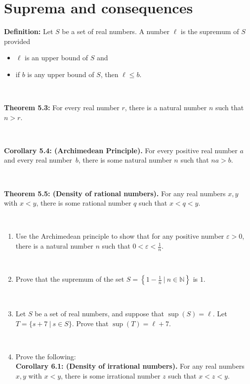 \documentclass[12pt]{amsart}
\newcommand{\N}{\mathbb{N}}
\newcommand{\e}{\varepsilon}
\newcommand{\ds}{\displaystyle}
\begin{document}
	
	\thispagestyle{empty}
	
	\section*{Suprema and consequences}
	
	

\begin{framed}
\noindent \textbf{Definition:} Let $S$ be a set of real numbers. A number $\ell$ is the supremum of $S$ provided
\begin{itemize}
\item $\ell$ is an upper bound of $S$ and 
\item if $b$ is any upper bound of $S$, then $\ell \leq b$.
\end{itemize}

\

\noindent \textbf{Theorem 5.3:} For every real number $r$, there is a natural number $n$ such that $n>r$.

\

\noindent \textbf{Corollary 5.4: (Archimedean Principle).} For every positive real number $a$ and every real number~$b$, there is some natural number $n$ such that $na>b$.

\

\noindent \textbf{Theorem 5.5: (Density of rational numbers).} For any real numbers $x,y$ with $x<y$, there is some rational number $q$ such that $x<q<y$.
\end{framed}

\

\begin{enumerate}
\item Use the Archimedean principle to show that for any positive number $\e>0$, there is a natural number $n$ such that $\ds 0 < \e < \frac{1}{n}$.

\

\item Prove that the supremum of the set $\ds S= \left\{ 1 - \frac1n \ | \ n\in \N\right\}$ is $1$.

\

\item Let $S$ be a set of real numbers, and suppose that $\sup(S)=\ell$. Let $T=\{s+7 \ | \ s\in S\}$. Prove that $\sup(T) = \ell + 7$.

\

\item Prove the following:\\
\textbf{Corollary 6.1: (Density of irrational numbers).} For any real numbers $x,y$ with $x<y$, there is some irrational number $z$ such that $x<z<y$.

\end{enumerate}
\end{document}

